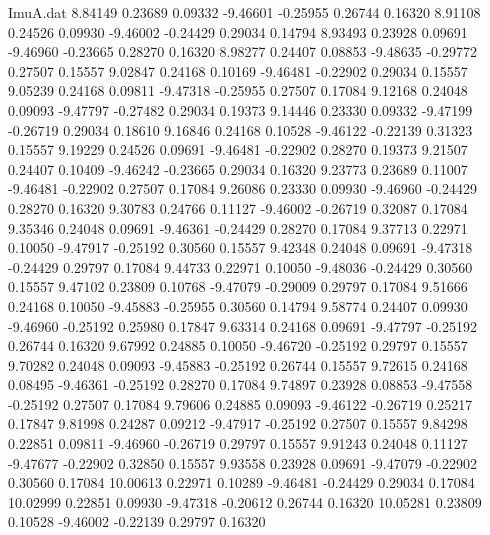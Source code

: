 \begin{filecontents}{ImuA.dat}
   8.84149    0.23689    0.09332   -9.46601   -0.25955    0.26744    0.16320
   8.91108    0.24526    0.09930   -9.46002   -0.24429    0.29034    0.14794
   8.93493    0.23928    0.09691   -9.46960   -0.23665    0.28270    0.16320
   8.98277    0.24407    0.08853   -9.48635   -0.29772    0.27507    0.15557
   9.02847    0.24168    0.10169   -9.46481   -0.22902    0.29034    0.15557
   9.05239    0.24168    0.09811   -9.47318   -0.25955    0.27507    0.17084
   9.12168    0.24048    0.09093   -9.47797   -0.27482    0.29034    0.19373
   9.14446    0.23330    0.09332   -9.47199   -0.26719    0.29034    0.18610
   9.16846    0.24168    0.10528   -9.46122   -0.22139    0.31323    0.15557
   9.19229    0.24526    0.09691   -9.46481   -0.22902    0.28270    0.19373
   9.21507    0.24407    0.10409   -9.46242   -0.23665    0.29034    0.16320
   9.23773    0.23689    0.11007   -9.46481   -0.22902    0.27507    0.17084
   9.26086    0.23330    0.09930   -9.46960   -0.24429    0.28270    0.16320
   9.30783    0.24766    0.11127   -9.46002   -0.26719    0.32087    0.17084
   9.35346    0.24048    0.09691   -9.46361   -0.24429    0.28270    0.17084
   9.37713    0.22971    0.10050   -9.47917   -0.25192    0.30560    0.15557
   9.42348    0.24048    0.09691   -9.47318   -0.24429    0.29797    0.17084
   9.44733    0.22971    0.10050   -9.48036   -0.24429    0.30560    0.15557
   9.47102    0.23809    0.10768   -9.47079   -0.29009    0.29797    0.17084
   9.51666    0.24168    0.10050   -9.45883   -0.25955    0.30560    0.14794
   9.58774    0.24407    0.09930   -9.46960   -0.25192    0.25980    0.17847
   9.63314    0.24168    0.09691   -9.47797   -0.25192    0.26744    0.16320
   9.67992    0.24885    0.10050   -9.46720   -0.25192    0.29797    0.15557
   9.70282    0.24048    0.09093   -9.45883   -0.25192    0.26744    0.15557
   9.72615    0.24168    0.08495   -9.46361   -0.25192    0.28270    0.17084
   9.74897    0.23928    0.08853   -9.47558   -0.25192    0.27507    0.17084
   9.79606    0.24885    0.09093   -9.46122   -0.26719    0.25217    0.17847
   9.81998    0.24287    0.09212   -9.47917   -0.25192    0.27507    0.15557
   9.84298    0.22851    0.09811   -9.46960   -0.26719    0.29797    0.15557
   9.91243    0.24048    0.11127   -9.47677   -0.22902    0.32850    0.15557
   9.93558    0.23928    0.09691   -9.47079   -0.22902    0.30560    0.17084
  10.00613    0.22971    0.10289   -9.46481   -0.24429    0.29034    0.17084
  10.02999    0.22851    0.09930   -9.47318   -0.20612    0.26744    0.16320
  10.05281    0.23809    0.10528   -9.46002   -0.22139    0.29797    0.16320

\end{filecontents}
